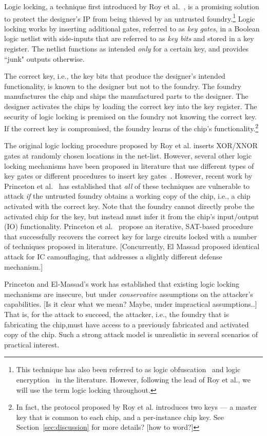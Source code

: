 Logic locking, a technique first introduced by Roy et al.~\cite{}, 
is a promising solution to protect the designer's IP from 
being thieved by an untrusted foundry.\footnote{This technique has 
also been referred to as logic obfuscation~\cite{} and logic encryption~\cite{} in the literature. However, following the lead of Roy et al., we will use the term logic locking throughout.}  
Logic locking works by inserting 
additional gates, referred to as \emph{key gates}, 
in a Boolean 
logic netlist with 
side-inputs that are referred to as \emph{key bits} and 
stored in a key register. 
The netlist functions as intended \emph{only} 
for a certain key, and provides ``junk" 
outputs otherwise. 

The correct key, i.e., 
the key bits that produce the designer's intended 
functionality, 
is known to the designer but not to the foundry. The foundry manufactures the chip and ships the manufactured parts to the 
designer. The designer activates the chips by loading the 
correct key into the key register. 
The security of logic locking 
is premised on the foundry not knowing the correct key.
If the correct key is compromised, the foundry learns of the 
chip's functionality.\footnote{In fact, the protocol proposed by Roy et al. introduces two keys --- a master key that is common to each chip, and a per-instance chip key. See Section~\ref{sec:discussion} for more details? [how to word?]} 

The original logic locking procedure proposed by Roy et al. 
inserts XOR/XNOR gates at randomly chosen locations in the 
net-list. However, several other logic locking mechanisms have been proposed in literature that use different types of key gates or 
different procedures to insert key gates~\cite{}.   
However, recent work by Princeton et al.~\cite{} has 
established 
that \emph{all} of these techniques 
are vulnerable to attack \emph{if} the 
untrusted foundry obtains a 
working copy of the chip, i.e., 
a chip activated with the correct key. 
Note that the foundry cannot directly 
probe the activated chip for the key, but instead 
must infer it from 
the chip's input/output (IO) functionality.   
Princeton 
et al.~\cite{} propose an iterative, SAT-based procedure 
that successfully recovers the correct key for large 
circuits locked 
with a number of techniques proposed in literature. 
[Concurrently, El Massad proposed identical attack for IC camouflaging, that addresses a slightly different defense mechanism.]

Princeton and El-Massad's work has established that 
existing logic 
locking mechanisms are insecure, but 
under \emph{conservative}  
assumptions on the attacker's capabilities.
[Is it clear what we mean? Maybe, under impractical assumptions..] 
That is, for the
attack to succeed, the attacker, i.e., the foundry that is fabricating the chip,must have access to a previously fabricated and 
activated copy of the chip.
Such a strong attack model 
is unrealistic in several scenarios of 
practical interest. 


